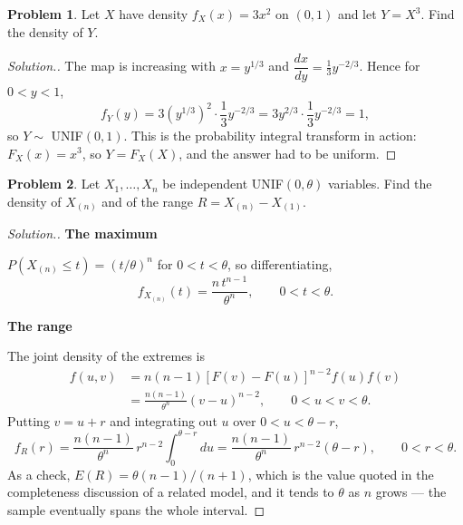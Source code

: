 \documentclass[11pt,a4paper]{article}
\theoremstyle{definition}
\newtheorem{problemx}{Problem}[subsection]
\newenvironment{problem}{\begin{problemx}}{\end{problemx}}
\newenvironment{solution}
  {\renewcommand{\qedsymbol}{}\begin{proof}[\textit{Solution}.]}
  {\end{proof}}
\newcommand{\subhead}[1]{%
  \par\medskip\noindent\textbf{#1}\par\nobreak\smallskip}
\begin{document}
\begin{problem}
Let $X$ have density $f_X(x) = 3x^{2}$ on $(0,1)$ and let $Y = X^{3}$. Find the
density of $Y$.
\end{problem}
\begin{solution}
The map is increasing with $x = y^{1/3}$ and
$\dfrac{dx}{dy} = \tfrac13 y^{-2/3}$. Hence for $0<y<1$,
$$f_Y(y) = 3\left(y^{1/3}\right)^{2}\cdot\frac13 y^{-2/3}
= 3y^{2/3}\cdot\frac13 y^{-2/3} = 1 ,$$
so $Y\sim$ UNIF$(0,1)$. This is the probability integral transform in action:
$F_X(x) = x^{3}$, so $Y = F_X(X)$, and the answer had to be uniform.
\end{solution}

\begin{problem}
Let $X_1,\dots,X_n$ be independent UNIF$(0,\theta)$ variables. Find the density
of $X_{(n)}$ and of the range $R = X_{(n)}-X_{(1)}$.
\end{problem}
\begin{solution}
\subhead{The maximum}
$P\left(X_{(n)}\leq t\right) = \left(t/\theta\right)^{n}$ for $0<t<\theta$, so
differentiating,
$$f_{X_{(n)}}(t) = \frac{n\,t^{n-1}}{\theta^{n}},\qquad 0<t<\theta .$$

\subhead{The range}
The joint density of the extremes is
\begin{align*}
f(u,v) &= n(n-1)\left[F(v)-F(u)\right]^{n-2}f(u)f(v) \\
&= \frac{n(n-1)}{\theta^{n}}\left(v-u\right)^{n-2},\qquad 0<u<v<\theta .
\end{align*}
Putting $v = u+r$ and integrating out $u$ over $0<u<\theta-r$,
$$f_R(r) = \frac{n(n-1)}{\theta^{n}}\,r^{n-2}\int_0^{\theta-r}du
= \frac{n(n-1)}{\theta^{n}}\,r^{n-2}\left(\theta-r\right),\qquad 0<r<\theta .$$
As a check, $E(R) = \theta(n-1)/(n+1)$, which is the value quoted in the
completeness discussion of a related model, and it tends to $\theta$ as $n$
grows --- the sample eventually spans the whole interval.
\end{solution}
\end{document}
